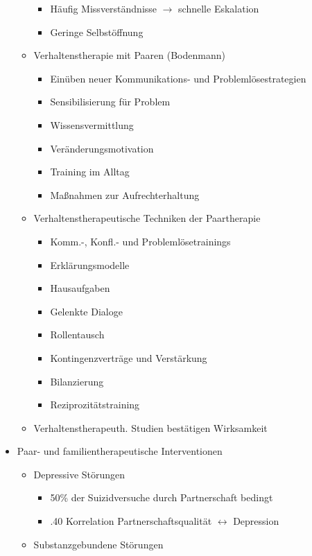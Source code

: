 \documentclass[11pt, paper=a4, twocolumn]{scrartcl}
\begin{document}
\begin{itemize}
\begin{itemize}
\begin{itemize}
							\item Häufig Missverständnisse $\rightarrow$ schnelle Eskalation
							\item Geringe Selbstöffnung
						\end{itemize}
					\item Verhaltenstherapie mit Paaren (Bodenmann)
						\begin{itemize}
							\item Einüben neuer Kommunikations- und Problemlösestrategien
							\item Sensibilisierung für Problem 
							\item Wissensvermittlung
							\item Veränderungsmotivation
							\item Training im Alltag
							\item Maßnahmen zur Aufrechterhaltung
						\end{itemize}
					\item Verhaltenstherapeutische Techniken der Paartherapie
						\begin{itemize}
							\item Komm.-, Konfl.- und Problemlösetrainings
							\item Erklärungsmodelle
							\item Hausaufgaben
							\item Gelenkte Dialoge
							\item Rollentausch
							\item Kontingenzverträge und Verstärkung
							\item Bilanzierung
							\item Reziprozitätstraining
						\end{itemize}
					\item Verhaltenstherapeuth. Studien bestätigen Wirksamkeit
				\end{itemize}
			\item Paar- und familientherapeutische Interventionen
				\begin{itemize}
					\item Depressive Störungen
						\begin{itemize}
							\item 50\% der Suizidversuche durch Partnerschaft bedingt
							\item .40 Korrelation Partnerschaftsqualität $\leftrightarrow$ Depression
						\end{itemize}
					\item Substanzgebundene Störungen
						\begin{itemize}

\end{itemize}
\end{itemize}
\end{itemize}
\end{document}
